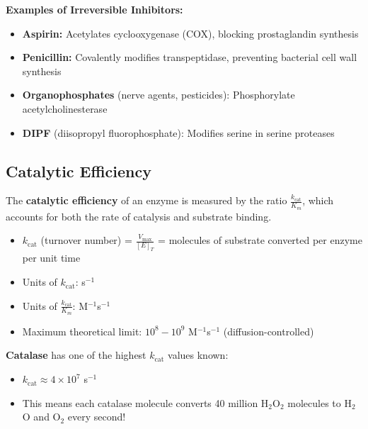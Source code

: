 \begin{example}
\textbf{Examples of Irreversible Inhibitors:}
\begin{itemize}
    \item \textbf{Aspirin:} Acetylates cyclooxygenase (COX), blocking prostaglandin synthesis
    \item \textbf{Penicillin:} Covalently modifies transpeptidase, preventing bacterial cell wall synthesis
    \item \textbf{Organophosphates} (nerve agents, pesticides): Phosphorylate acetylcholinesterase
    \item \textbf{DIPF} (diisopropyl fluorophosphate): Modifies serine in serine proteases
\end{itemize}
\end{example}

\subsection{Catalytic Efficiency}

\begin{definition}
The \textbf{catalytic efficiency} of an enzyme is measured by the ratio $\frac{k_{\text{cat}}}{K_m}$, which accounts for both the rate of catalysis and substrate binding.
\end{definition}

\begin{itemize}
    \item $k_{\text{cat}}$ (turnover number) = $\frac{V_{\max}}{[E]_T}$ = molecules of substrate converted per enzyme per unit time
    \item Units of $k_{\text{cat}}$: s$^{-1}$
    \item Units of $\frac{k_{\text{cat}}}{K_m}$: M$^{-1}$s$^{-1}$
    \item Maximum theoretical limit: $10^8 - 10^9$ M$^{-1}$s$^{-1}$ (diffusion-controlled)
\end{itemize}

\begin{example}
\textbf{Catalase} has one of the highest $k_{\text{cat}}$ values known:
\begin{itemize}
    \item $k_{\text{cat}} \approx 4 \times 10^7$ s$^{-1}$
    \item This means each catalase molecule converts 40 million H$_2$O$_2$ molecules to H$_2$O and O$_2$ every second!
\end{itemize}
\end{example}

